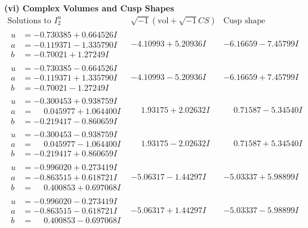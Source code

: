 \documentclass[1p]{elsarticle_modified}
\theoremstyle{definition}
\newcommand{\I}{\sqrt{-1}}
\begin{document}
\newpage\flushleft \textbf{(vi) Complex Volumes and Cusp Shapes}
$$\begin{array}{c|c|c}  
\text{Solutions to }I^u_{2}& \I (\text{vol} + \sqrt{-1}CS) & \text{Cusp shape}\\
 \hline 
\begin{aligned}
u &= -0.730385 + 0.664526 I \\
a &= -0.119371 - 1.335790 I \\
b &= -0.70021 + 1.27249 I\end{aligned}
 & -4.10993 + 5.20936 I & -6.16659 - 7.45799 I \\ \hline\begin{aligned}
u &= -0.730385 - 0.664526 I \\
a &= -0.119371 + 1.335790 I \\
b &= -0.70021 - 1.27249 I\end{aligned}
 & -4.10993 - 5.20936 I & -6.16659 + 7.45799 I \\ \hline\begin{aligned}
u &= -0.300453 + 0.938759 I \\
a &= \phantom{-}0.045977 + 1.064400 I \\
b &= -0.219417 - 0.860659 I\end{aligned}
 & \phantom{-}1.93175 + 2.02632 I & \phantom{-}0.71587 - 5.34540 I \\ \hline\begin{aligned}
u &= -0.300453 - 0.938759 I \\
a &= \phantom{-}0.045977 - 1.064400 I \\
b &= -0.219417 + 0.860659 I\end{aligned}
 & \phantom{-}1.93175 - 2.02632 I & \phantom{-}0.71587 + 5.34540 I \\ \hline\begin{aligned}
u &= -0.996020 + 0.273419 I \\
a &= -0.863515 + 0.618721 I \\
b &= \phantom{-}0.400853 + 0.697068 I\end{aligned}
 & -5.06317 - 1.44297 I & -5.03337 + 5.98899 I \\ \hline\begin{aligned}
u &= -0.996020 - 0.273419 I \\
a &= -0.863515 - 0.618721 I \\
b &= \phantom{-}0.400853 - 0.697068 I\end{aligned}
 & -5.06317 + 1.44297 I & -5.03337 - 5.98899 I \\ \hline\begin{aligned}

\end{aligned}
\end{array}$$
\end{document}
